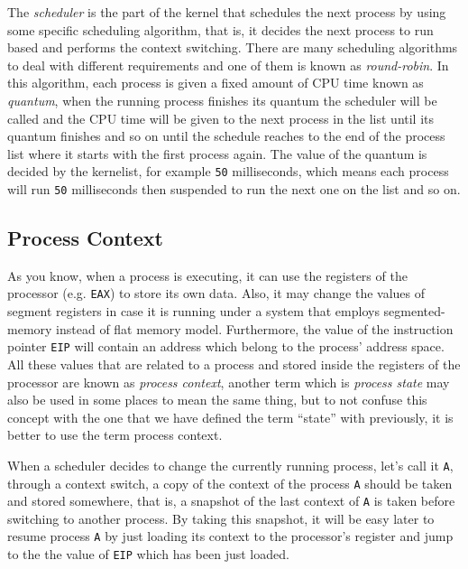 The \emph{scheduler} is the part of the kernel that schedules the next
process by using some specific scheduling algorithm, that is, it decides
the next process to run based and performs the context switching. There
are many scheduling algorithms to deal with different requirements and
one of them is known as \emph{round-robin}. In this algorithm, each
process is given a fixed amount of CPU time known as \emph{quantum},
when the running process finishes its quantum the scheduler will be
called and the CPU time will be given to the next process in the list
until its quantum finishes and so on until the schedule reaches to the
end of the process list where it starts with the first process again.
The value of the quantum is decided by the kernelist, for example
\lstinline!50! milliseconds, which means each process will run
\lstinline!50! milliseconds then suspended to run the next one on the
list and so on.

\subsection{Process Context}\label{process-context}

As you know, when a process is executing, it can use the registers of
the processor (e.g. \lstinline!EAX!) to store its own data. Also, it may
change the values of segment registers in case it is running under a
system that employs segmented-memory instead of flat memory model.
Furthermore, the value of the instruction pointer \lstinline!EIP! will
contain an address which belong to the process' address space. All these
values that are related to a process and stored inside the registers of
the processor are known as \emph{process context}, another term which is
\emph{process state} may also be used in some places to mean the same
thing, but to not confuse this concept with the one that we have defined
the term ``state'' with previously, it is better to use the term process
context.

When a scheduler decides to change the currently running process, let's
call it \lstinline!A!, through a context switch, a copy of the context
of the process \lstinline!A! should be taken and stored somewhere, that
is, a snapshot of the last context of \lstinline!A! is taken before
switching to another process. By taking this snapshot, it will be easy
later to resume process \lstinline!A! by just loading its context to the
processor's register and jump to the the value of \lstinline!EIP! which
has been just loaded.

